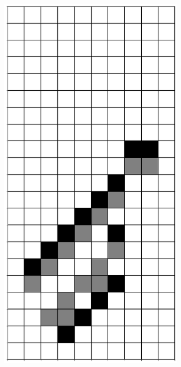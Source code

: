\documentclass[12pt]{article}
\numberwithin{figure}{section} %
\begin{document}
\begin{figure}[H]
\begin{subfigure}{0.3\textwidth}
     \subcaption{}
   \end{subfigure}
     \begin{subfigure}{0.3\textwidth}
     \centering
     \includegraphics[angle=270,width=\linewidth]{Section4/23.1}

\end{subfigure}
\end{figure}
\end{document}
